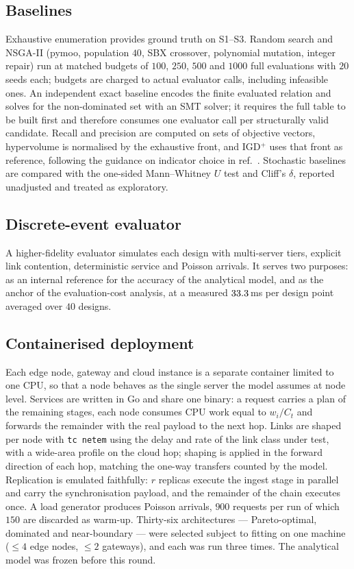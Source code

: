 \subsection*{Baselines}
Exhaustive enumeration provides ground truth on S1--S3. Random search and
NSGA-II\cite{deb2002nsga2} (pymoo\cite{blank2020pymoo}, population $40$, SBX crossover,
polynomial mutation, integer repair) run at matched budgets of $100$, $250$, $500$ and
$1000$ full evaluations with $20$ seeds each; budgets are charged to actual evaluator
calls, including infeasible ones. An independent exact baseline encodes the finite
evaluated relation and solves for the non-dominated set with an SMT
solver\cite{demoura2008z3}; it requires the full table to be built first and therefore
consumes one evaluator call per structurally valid candidate. Recall and precision are
computed on sets of objective vectors, hypervolume\cite{zitzler1999hv} is normalised by
the exhaustive front, and IGD$^{+}$\cite{ishibuchi2015igdplus} uses that front as
reference, following the guidance on indicator choice in ref.~.
Stochastic baselines are compared with the one-sided Mann--Whitney
$U$ test\cite{mann1947whitney} and Cliff's $\delta$\cite{cliff1993delta}, reported
unadjusted and treated as exploratory.

\subsection*{Discrete-event evaluator}
A higher-fidelity evaluator simulates each design with multi-server tiers, explicit link
contention, deterministic service and Poisson arrivals. It serves two purposes: as an
internal reference for the accuracy of the analytical model, and as the anchor of the
evaluation-cost analysis, at a measured $33.3$\,ms per design point averaged over
$40$ designs.

\subsection*{Containerised deployment}
Each edge node, gateway and cloud instance is a separate container limited to one CPU, so
that a node behaves as the single server the model assumes at node level. Services are
written in Go and share one binary: a request carries a plan of the remaining stages,
each node consumes CPU work equal to $w_i/C_t$ and forwards the remainder with the real
payload to the next hop. Links are shaped per node with \texttt{tc netem}
\cite{hemminger2005netem} using the delay and rate of the link class under test, with a
wide-area profile on the cloud hop; shaping is applied in the forward direction of each
hop, matching the one-way transfers counted by the model. Replication is emulated
faithfully: $r$ replicas execute the ingest stage in parallel and carry the
synchronisation payload, and the remainder of the chain executes once. A load generator
produces Poisson arrivals, $900$ requests per run of which $150$ are discarded as warm-up.
Thirty-six architectures --- Pareto-optimal, dominated and near-boundary --- were selected
subject to fitting on one machine ($\le4$ edge nodes, $\le2$ gateways), and each was run
three times. The analytical model was frozen before this round.

